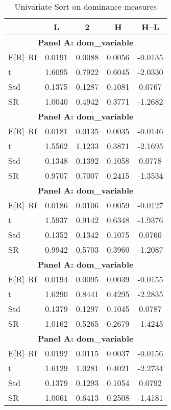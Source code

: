\begin{table}[ht]
\centering
\caption{Univariate Sort on dominance measures}
\label{tab:univariate_sort}

\begin{tabular}{lcccc}
\toprule
       & L    & 2    & H    & H--L \\
\midrule

\multicolumn{5}{c}{\textbf{Panel A: {dom_variable}}} \\
\midrule
E[R]--Rf & 0.0191 & 0.0088 & 0.0056 & -0.0135 \\
t & 1.6095 & 0.7922 & 0.6045 & -2.0330 \\
Std & 0.1375 & 0.1287 & 0.1081 & 0.0767 \\
SR & 1.0040 & 0.4942 & 0.3771 & -1.2682 \\
\midrule

\multicolumn{5}{c}{\textbf{Panel A: {dom_variable}}} \\
\midrule
E[R]--Rf & 0.0181 & 0.0135 & 0.0035 & -0.0146 \\
t & 1.5562 & 1.1233 & 0.3871 & -2.1695 \\
Std & 0.1348 & 0.1392 & 0.1058 & 0.0778 \\
SR & 0.9707 & 0.7007 & 0.2415 & -1.3534 \\
\midrule

\multicolumn{5}{c}{\textbf{Panel A: {dom_variable}}} \\
\midrule
E[R]--Rf & 0.0186 & 0.0106 & 0.0059 & -0.0127 \\
t & 1.5937 & 0.9142 & 0.6348 & -1.9376 \\
Std & 0.1352 & 0.1342 & 0.1075 & 0.0760 \\
SR & 0.9942 & 0.5703 & 0.3960 & -1.2087 \\
\midrule

\multicolumn{5}{c}{\textbf{Panel A: {dom_variable}}} \\
\midrule
E[R]--Rf & 0.0194 & 0.0095 & 0.0039 & -0.0155 \\
t & 1.6290 & 0.8441 & 0.4295 & -2.2835 \\
Std & 0.1379 & 0.1297 & 0.1045 & 0.0787 \\
SR & 1.0162 & 0.5265 & 0.2679 & -1.4245 \\
\midrule

\multicolumn{5}{c}{\textbf{Panel A: {dom_variable}}} \\
\midrule
E[R]--Rf & 0.0192 & 0.0115 & 0.0037 & -0.0156 \\
t & 1.6129 & 1.0281 & 0.4021 & -2.2734 \\
Std & 0.1379 & 0.1293 & 0.1054 & 0.0792 \\
SR & 1.0061 & 0.6413 & 0.2508 & -1.4181 \\
\midrule


\end{tabular}
\end{table}
